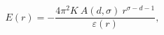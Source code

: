 \begin{equation} 
E(r)=-\frac{4\pi^2K  ~ A(d,\sigma) ~r^{\sigma-d-1}}{\varepsilon(r)}, 
\end{equation}

